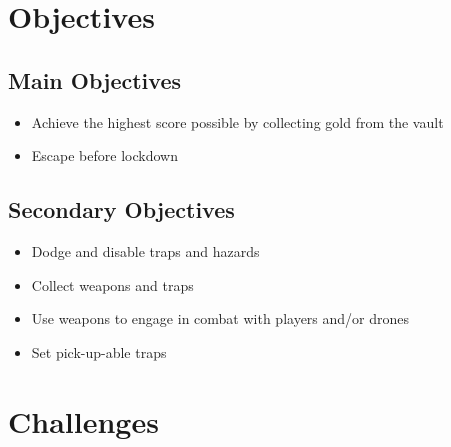 \documentclass[14pt]{report}
\begin{document}

\section{Objectives}
\subsection{Main Objectives}
\begin{itemize}
    \item Achieve the highest score possible by collecting gold from the vault
    \item Escape before lockdown
\end{itemize}

\subsection{Secondary Objectives}
\begin{itemize}
    \item Dodge and disable traps and hazards
    \item Collect weapons and traps
    \item Use weapons to engage in combat with players and/or drones
    \item Set pick-up-able traps
\end{itemize}

\section{Challenges}    
\end{document}
